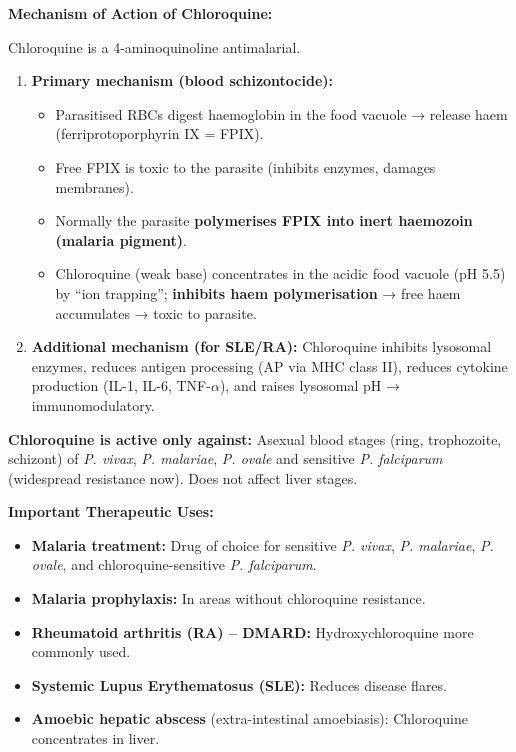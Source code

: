 \documentclass[11pt,a4paper]{article}
\begin{document}
\begin{ansbox}
\textbf{Mechanism of Action of Chloroquine:}

Chloroquine is a 4-aminoquinoline antimalarial.

\begin{enumerate}[leftmargin=*]
    \item \textbf{Primary mechanism (blood schizontocide):}
    \begin{itemize}
        \item Parasitised RBCs digest haemoglobin in the food vacuole → release haem (ferriprotoporphyrin IX = FPIX).
        \item Free FPIX is toxic to the parasite (inhibits enzymes, damages membranes).
        \item Normally the parasite \textbf{polymerises FPIX into inert haemozoin (malaria pigment)}.
        \item Chloroquine (weak base) concentrates in the acidic food vacuole (pH 5.5) by ``ion trapping''; \textbf{inhibits haem polymerisation} → free haem accumulates → toxic to parasite.
    \end{itemize}
    \item \textbf{Additional mechanism (for SLE/RA):} Chloroquine inhibits lysosomal enzymes, reduces antigen processing (AP via MHC class II), reduces cytokine production (IL-1, IL-6, TNF-$\alpha$), and raises lysosomal pH → immunomodulatory.
\end{enumerate}

\textbf{Chloroquine is active only against:} Asexual blood stages (ring, trophozoite, schizont) of \textit{P. vivax}, \textit{P. malariae}, \textit{P. ovale} and sensitive \textit{P. falciparum} (widespread resistance now). Does not affect liver stages.

\textbf{Important Therapeutic Uses:}
\begin{itemize}[leftmargin=*]
    \item \textbf{Malaria treatment:} Drug of choice for sensitive \textit{P. vivax}, \textit{P. malariae}, \textit{P. ovale}, and chloroquine-sensitive \textit{P. falciparum}.
    \item \textbf{Malaria prophylaxis:} In areas without chloroquine resistance.
    \item \textbf{Rheumatoid arthritis (RA) -- DMARD:} Hydroxychloroquine more commonly used.
    \item \textbf{Systemic Lupus Erythematosus (SLE):} Reduces disease flares.
    \item \textbf{Amoebic hepatic abscess} (extra-intestinal amoebiasis): Chloroquine concentrates in liver.
\end{itemize}


\end{ansbox}
\end{document}
